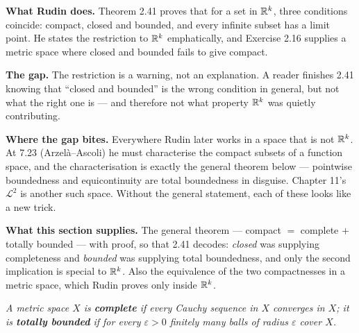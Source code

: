 
\begin{roadmap}
\raggedright
\textbf{What Rudin does.} Theorem 2.41 proves that for a set in $\mathbb{R}^k$,
three conditions coincide: compact, closed and bounded, and every infinite
subset has a limit point. He states the restriction to $\mathbb{R}^k$ emphatically,
and Exercise 2.16 supplies a metric space where closed and bounded fails to
give compact.

\smallskip
\textbf{The gap.} The restriction is a warning, not an explanation. A reader
finishes 2.41 knowing that ``closed and bounded'' is the wrong condition in
general, but not what the right one is --- and therefore not what property
$\mathbb{R}^k$ was quietly contributing.

\smallskip
\textbf{Where the gap bites.} Everywhere Rudin later works in a space that is
not $\mathbb{R}^k$. At 7.23 (Arzel\`a--Ascoli) he must characterise the compact
subsets of a function space, and the characterisation is exactly the general
theorem below --- pointwise boundedness and equicontinuity are total
boundedness in disguise. Chapter 11's $\mathscr L^2$ is another such space.
Without the general statement, each of these looks like a new trick.

\smallskip
\textbf{What this section supplies.} The general theorem --- compact
$=$ complete $+$ totally bounded --- with proof, so that 2.41 decodes:
\emph{closed} was supplying completeness and \emph{bounded} was supplying
total boundedness, and only the second implication is special to $\mathbb{R}^k$.
Also the equivalence of the two compactnesses in a metric space, which Rudin
proves only inside $\mathbb{R}^k$.
\end{roadmap}

\emph{A metric space $X$ is \textbf{complete} if every Cauchy sequence in $X$
converges in $X$; it is \textbf{totally bounded} if for every
$\varepsilon>0$ finitely many balls of radius $\varepsilon$ cover $X$.}

